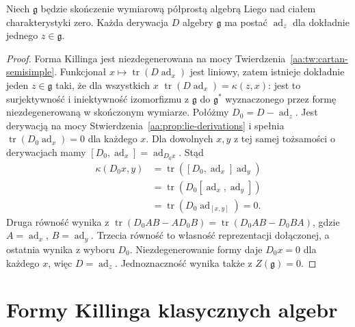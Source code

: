 \begin{twierdzenie}
\label{aa:tw:semisimple-derivations}
Niech $\mathfrak g$ będzie skończenie wymiarową
półprostą algebrą Liego nad ciałem charakterystyki
zero. Każda derywacja $D$ algebry $\mathfrak g$
ma postać $\operatorname{ad}_z$ dla dokładnie
jednego $z\in\mathfrak g$.
\end{twierdzenie}
\begin{proof}
Forma Killinga jest niezdegenerowana na mocy
Twierdzenia~\ref{aa:tw:cartan-semisimple}.
Funkcjonał $x\mapsto\operatorname{tr}
(D\operatorname{ad}_x)$ jest liniowy,
zatem istnieje dokładnie jeden $z\in\mathfrak g$
taki, że dla wszystkich $x$
$\operatorname{tr}(D\operatorname{ad}_x)=\kappa(z,x)$:
jest to surjektywność i iniektywność izomorfizmu
z $\mathfrak g$ do $\mathfrak g^*$ wyznaczonego
przez formę niezdegenerowaną w skończonym wymiarze.
Połóżmy $D_0=D-\operatorname{ad}_z$.
Jest derywacją na mocy
Stwierdzenia~\ref{aa:prop:lie-derivations}
i spełnia $\operatorname{tr}(D_0\operatorname{ad}_x)=0$
dla każdego $x$. Dla dowolnych $x,y$ z tej samej
tożsamości o derywacjach mamy
$[D_0,\operatorname{ad}_x]=\operatorname{ad}_{D_0x}$.
Stąd
\[
\begin{aligned}
 \kappa(D_0x,y)
 &=\operatorname{tr}([D_0,\operatorname{ad}_x]
                   \operatorname{ad}_y)\\
 &=\operatorname{tr}(D_0[\operatorname{ad}_x,
                                  \operatorname{ad}_y])\\
 &=\operatorname{tr}(D_0\operatorname{ad}_{[x,y]})=0.
\end{aligned}
\]
Druga równość wynika z
$\operatorname{tr}(D_0AB-AD_0B)
=\operatorname{tr}(D_0AB-D_0BA)$, gdzie
$A=\operatorname{ad}_x$, $B=\operatorname{ad}_y$.
Trzecia równość to własność reprezentacji dołączonej,
a ostatnia wynika z wyboru $D_0$.
Niezdegenerowanie formy daje $D_0x=0$ dla
każdego $x$, więc $D=\operatorname{ad}_z$.
Jednoznaczność wynika także z $Z(\mathfrak g)=0$.
\end{proof}

\section{Formy Killinga klasycznych algebr}

